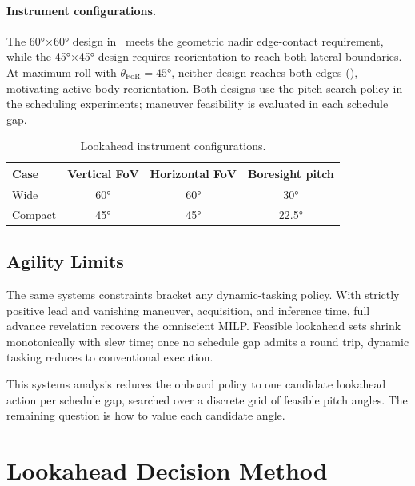 \paragraph{Instrument configurations.}
The \ang{60}$\times$\ang{60} design in~ meets the geometric nadir edge-contact requirement, while the \ang{45}$\times$\ang{45} design requires reorientation to reach both lateral boundaries. At maximum roll with $\theta_{\mathrm{FoR}}=\ang{45}$, neither design reaches both edges (), motivating active body reorientation. Both designs use the pitch-search policy in the scheduling experiments; maneuver feasibility is evaluated in each schedule gap.

\begin{table}[htbp]
\centering
\caption{Lookahead instrument configurations.}
\label{tab:lookahead_cases}
\begin{tabular}{@{}lccc@{}}
\toprule
\textbf{Case} & \textbf{Vertical FoV} & \textbf{Horizontal FoV} & \textbf{Boresight pitch} \\
\midrule
Wide       & \ang{60} & \ang{60} & \ang{30}   \\
Compact    & \ang{45} & \ang{45} & \ang{22.5} \\
\bottomrule
\end{tabular}
\end{table}
\FloatBarrier

\subsection{Agility Limits}
\label{sec:agility_limits}

The same systems constraints bracket any dynamic-tasking policy.
With strictly positive lead and vanishing maneuver, acquisition, and inference time, full advance revelation recovers the omniscient MILP.
Feasible lookahead sets shrink monotonically with slew time; once no schedule gap admits a round trip, dynamic tasking reduces to conventional execution.

This systems analysis reduces the onboard policy to one candidate lookahead action per schedule gap, searched over a discrete grid of feasible pitch angles.
The remaining question is how to value each candidate angle.

\section{Lookahead Decision Method}
\label{sec:method}

